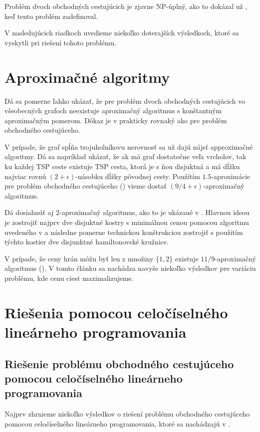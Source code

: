 Problém dvoch obchodných cestujúcich je zjavne NP-úplný, ako to dokázal
už \cite{krarup}, keď tento problém zadefinoval.

V nasledujúcich riadkoch uvedieme niekoľko doterajších výsledkoch, ktoré sa vyskytli
pri riešení tohoto problému.

\section{Aproximačné algoritmy}

Dá sa pomerne ľahko ukázať, že pre problém dvoch obchodných cestujúcich vo všeobecných grafoch
neexistuje aproximačný algoritmus s konštantným aproximačným pomerom. Dôkaz je v prakticky
rovnaký ako pre problém obchodného cestujúceho.

V prípade, že graf spĺňa trojuholníkovu nerovnosť sa už dajú nájsť approximačné algoritmy.
Dá sa napríklad ukázať, že ak má graf dostatočne veľa vrcholov, tak ku každej TSP ceste
existuje TSP cesta, ktorá je s ňou disjuktná a má dĺžku najviac rovnú $(2+\epsilon)$-násobku
dĺžky pôvodnej cesty.
Použítím $1.5$-aproximácie pre problém obchodného cestujúceho (\cite{christofides}) vieme
dostať $(9/4 + \epsilon)$-aproximačný algoritmus. 

Dá dosiahnúť aj $2$-aproximačný algoritmus, ako to je ukázané v \cite{apx2}. Hlavnou
ideou je zostrojiť najprv dve disjuktné kostry s minimálnou cenou pomocou algoritmu
uvedeného v \cite{spanning2} a následne pomerne technickou konštrukciou zostrojiť
s použitím týchto kostier dve disjunktné hamiltonovské kružnice.

V prípade, že ceny hrán môžu byť len z množiny $\{1,2\}$ existuje $11/9$-aproximačný
algoritmus (\cite{gimadi}). V tomto článku sa nachádza navyše niekoľko výsledkov pre 
variáciu problému, kde cenu ciest maximalizujeme.

\section{Riešenia pomocou celočíselného lineárneho programovania}

\subsection{Riešenie problému obchodného cestujúceho pomocou celočíselného
lineárneho programovania}

Najprv zhrnieme niekoľko výsledkov o riešení problému obchodného cestujúceho pomocou
celočíselného lineárneho programovania, ktoré sa nachádzajú v \cite{tspsurvey}.

